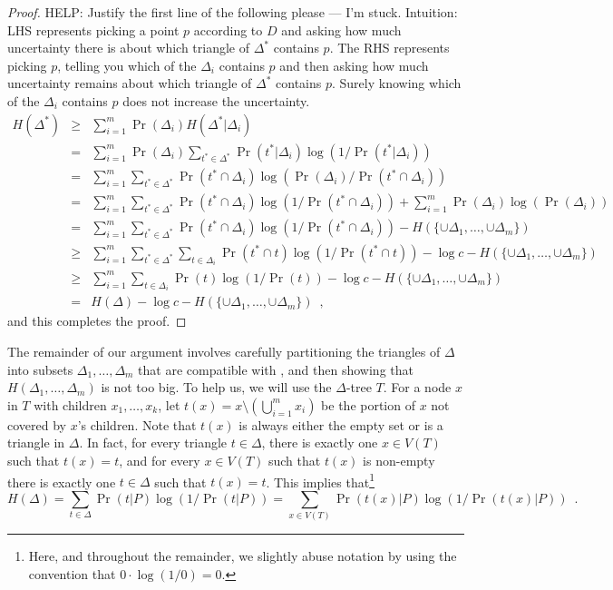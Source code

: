 \documentclass[lotsofwhite]{patmorin}
\begin{document}
\begin{proof}
HELP: Justify the first line of the following please --- I'm stuck.
Intuition: LHS represents picking a point $p$ according to $D$ and
asking how much uncertainty there is about which triangle of
$\Delta^*$ contains $p$.  The RHS represents picking $p$, telling you
which of the $\Delta_i$ contains $p$ and then asking how much
uncertainty remains about which triangle of $\Delta^*$ contains $p$.
Surely knowing which of the $\Delta_i$ contains $p$ does not increase
the uncertainty.
\begin{eqnarray*}
   H(\Delta^*) 
     & \ge & \sum_{i=1}^m \Pr(\Delta_i)H(\Delta^*|\Delta_i) \\
     &  =  & \sum_{i=1}^m \Pr(\Delta_i)\sum_{t^*\in\Delta^*}
       \Pr(t^*|\Delta_i)\log(1/\Pr(t^*|\Delta_i)) \\
     &  =  & \sum_{i=1}^m \sum_{t^*\in\Delta^*}
       \Pr(t^*\cap\Delta_i)\log(\Pr(\Delta_i)/\Pr(t^*\cap\Delta_i)) \\
     &  =  & \sum_{i=1}^m \sum_{t^*\in\Delta^*}
       \Pr(t^*\cap\Delta_i)\log(1/\Pr(t^*\cap\Delta_i)) 
        + \sum_{i=1}^m \Pr(\Delta_i)\log(\Pr(\Delta_i)) \\
     &  =  & \sum_{i=1}^m \sum_{t^*\in\Delta^*}
       \Pr(t^*\cap\Delta_i)\log(1/\Pr(t^*\cap\Delta_i)) 
        - H(\{\cup\Delta_1,\ldots,\cup\Delta_m\}) \\
     & \ge  & \sum_{i=1}^m \sum_{t^*\in\Delta^*}\sum_{t\in\Delta_i}
       \Pr(t^*\cap t)\log(1/\Pr(t^*\cap t)) 
        -\log c - H(\{\cup\Delta_1,\ldots,\cup\Delta_m\}) \\
     & \ge  & \sum_{i=1}^m \sum_{t\in\Delta_i}
       \Pr(t)\log(1/\Pr(t)) 
        -\log c - H(\{\cup\Delta_1,\ldots,\cup\Delta_m\}) \\
     &  =  & H(\Delta) -\log c - H(\{\cup\Delta_1,\ldots,\cup\Delta_m\}) 
            \enspace ,
\end{eqnarray*}
and this completes the proof.
\end{proof}

The remainder of our argument involves carefully partitioning the
triangles of $\Delta$ into subsets $\Delta_1,\ldots,\Delta_m$ that are
compatible with , and then showing that
$H(\Delta_1,\ldots,\Delta_m)$ is not too big.  To help us, we will use
the $\Delta$-tree $T$.  For a node $x$ in $T$ with children
$x_1,\ldots,x_k$, let $t(x) = x \setminus (\bigcup_{i=1}^m x_i)$ be
the portion of $x$ not covered by $x$'s children.  Note that $t(x)$ is
always either the empty set or is a triangle in $\Delta$.  In fact,
for every triangle $t\in\Delta$, there is exactly one $x\in V(T)$ such
that $t(x)=t$, and for every $x\in V(T)$ such that $t(x)$ is non-empty
there is exactly one $t\in\Delta$ such that $t(x)=t$.  This implies
that\footnote{Here, and throughout the remainder, we slightly abuse notation by
using the convention that $0\cdot\log(1/0)=0$.}
\[
    H(\Delta) = \sum_{t\in\Delta}\Pr(t|P)\log(1/\Pr(t|P)) =
       \sum_{x\in V(T)}\Pr(t(x)|P)\log(1/\Pr(t(x)|P)) \enspace .
\]
\end{document}
